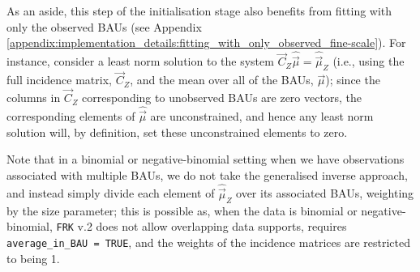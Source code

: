 \documentclass[12pt,a4paper]{article}
\begin{document}
\begin{appendices}
\begin{enumerate}
    
    
    As an aside, this step of the initialisation stage also benefits from fitting with only the observed BAUs (see Appendix \ref{appendix:implementation_details:fitting_with_only_observed_fine-scale}). 
    For instance, consider a least norm solution to the system $\vec{C}_Z \hat{\vec{\mu}} = \hat{\vec{\mu}}_Z$ (i.e., using the full incidence matrix, $\vec{C}_Z$, and the mean over all of the BAUs, $\vec{\mu}$); since the columns in $\vec{C}_Z$ corresponding to unobserved BAUs are zero vectors, the corresponding elements of $\hat{\vec{\mu}}$ are unconstrained, and hence any least norm solution will, by definition, set these unconstrained elements to zero.
    
    Note that in a binomial or negative-binomial setting when we have observations associated with multiple BAUs, we do not take the generalised inverse approach, and instead simply divide each element of $\hat{\vec{\mu}}_Z$ over its associated BAUs, weighting by the size parameter; this is possible as, when the data is binomial or negative-binomial, \texttt{FRK} v.2 does not allow overlapping data supports, requires \texttt{average\_in\_BAU = TRUE}, and the weights of the incidence matrices are restricted to being 1. 
    

\end{enumerate}
\end{appendices}
\end{document}
